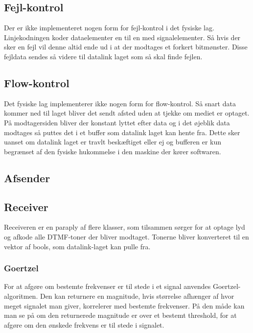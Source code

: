 \subsection{Fejl-kontrol}
Der er ikke implementeret nogen form for fejl-kontrol i det fysiske lag. Linjekodningen koder dataelementer en til en med signalelementer. Så hvis der sker en fejl vil denne altid ende ud i at der modtages et forkert bitmønster. Disse fejldata sendes så videre til datalink laget som så skal finde fejlen.

\subsection{Flow-kontrol}
Det fysiske lag implementerer ikke nogen form for flow-kontrol. Så snart data kommer ned til laget bliver det sendt afsted uden at tjekke om mediet er optaget. På modtagersiden bliver der konstant lyttet efter data og i det øjeblik data modtages så puttes det i et buffer som datalink laget kan hente fra. Dette sker uanset om datalink laget er travlt beskæftiget eller ej og bufferen er kun begrænset af den fysiske hukommelse i den maskine der kører softwaren.

\subsection{Afsender}



\subsection{Receiver}
Receiveren er en paraply af flere klasser, som tilsammen sørger for at optage lyd og afkode alle DTMF-toner der bliver modtaget. Tonerne bliver konverteret til en vektor af bools, som datalink-laget kan pulle fra.

\subsubsection{Goertzel}

For at afgøre om bestemte frekvenser er til stede i et signal anvendes Goertzel-algoritmen. Den kan returnere en magnitude, hvis størrelse afhænger af hvor meget signalet man giver, korrelerer med bestemte frekvenser. På den måde kan man se på om den returnerede magnitude er over et bestemt threshold, for at afgøre om den ønskede frekvens er til stede i signalet.\\

